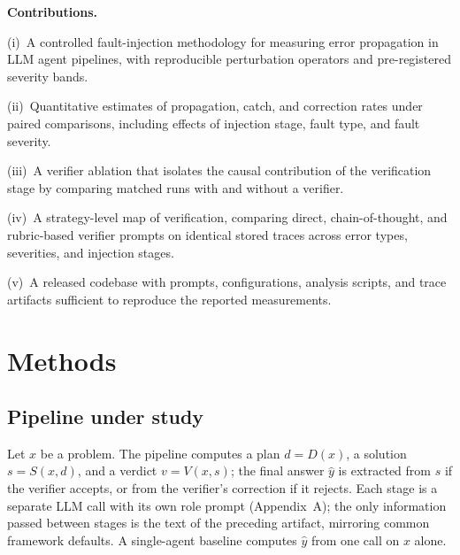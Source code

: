 \documentclass{article}
\begin{document}
\textbf{Contributions.}

(i)~A controlled fault-injection methodology for measuring error propagation
in LLM agent pipelines, with reproducible perturbation operators and
pre-registered severity bands.

(ii)~Quantitative estimates of propagation, catch, and correction rates under
paired comparisons, including effects of injection stage, fault type, and
fault severity.

(iii)~A verifier ablation that isolates the causal contribution of the
verification stage by comparing matched runs with and without a verifier.

(iv)~A strategy-level map of verification, comparing direct,
chain-of-thought, and rubric-based verifier prompts on identical stored
traces across error types, severities, and injection stages.

(v)~A released codebase with prompts, configurations, analysis scripts, and
trace artifacts sufficient to reproduce the reported measurements.

\section{Methods}

\subsection{Pipeline under study}
Let $x$ be a problem. The pipeline computes a plan $d = D(x)$, a solution
$s = S(x, d)$, and a verdict $v = V(x, s)$; the final answer $\hat{y}$ is
extracted from $s$ if the verifier accepts, or from the verifier's correction
if it rejects. Each stage is a separate LLM call with its own role prompt
(Appendix~A); the only information passed between stages is the text of the
preceding artifact, mirroring common framework defaults. A single-agent
baseline computes $\hat{y}$ from one call on $x$ alone.
\end{document}

